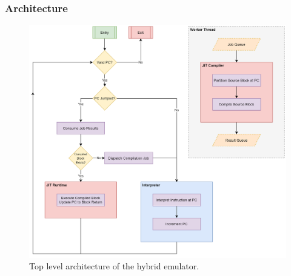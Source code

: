 \subsubsection{Architecture}
\label{section:hybrid-arch}


\begin{figure}[h]
    \centering
    \includegraphics[width=1\linewidth]{diagrams/hybrid.png}
    \caption{Top level architecture of the hybrid emulator.}
    \label{figure:hybrid-arch}
\end{figure}